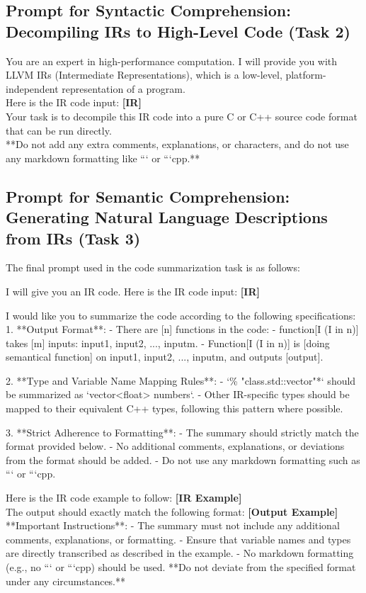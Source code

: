 \subsection{Prompt for Syntactic Comprehension: Decompiling IRs to
High-Level Code (Task 2)}
\begin{prompt} 
You are an expert in high-performance computation. I will provide you with LLVM IRs (Intermediate Representations), which is a low-level, platform-independent representation of a program.\\ 
Here is the IR code input:
        \textbf{[IR]}\\
Your task is to decompile this IR code into a pure C or C++ source code format that can be run directly.\\
**Do not add any extra comments, explanations, or characters, and do not use any markdown formatting like ``` or ```cpp.**     
\end{prompt}
\subsection{Prompt for Semantic Comprehension: Generating Natural
Language Descriptions from IRs (Task 3)}
The final prompt used in the code summarization task is as follows:
\begin{prompt}
      I will give you an IR code.
    Here is the IR code input:
     \textbf{[IR]}

I would like you to summarize the code according to the following specifications:
   1. **Output Format**:
   - There are [n] functions in the code:
   - function[I (I in n)] takes [m] inputs: input1, input2, ..., inputm.
   - Function[I (I in n)] is [doing semantical function] on input1, input2, ..., inputm, and outputs [output].

   2. **Type and Variable Name Mapping Rules**:
   - `\% "class.std::vector"*` should be summarized as `vector<float> numbers`.
   - Other IR-specific types should be mapped to their equivalent C++ types, following this pattern where possible.

   3. **Strict Adherence to Formatting**:
   - The summary should strictly match the format provided below.
   - No additional comments, explanations, or deviations from the format should be added.
   - Do not use any markdown formatting such as ``` or ```cpp.

    Here is the IR code example to follow:
     \textbf{[IR Example]}\\
    The output should exactly match the following format:
    \textbf{[Output Example]}\\
    **Important Instructions**:
    - The summary must not include any additional comments, explanations, or formatting.
    - Ensure that variable names and types are directly transcribed as described in the example.
    - No markdown formatting (e.g., no ``` or ```cpp) should be used.
    **Do not deviate from the specified format under any circumstances.**
\end{prompt}

